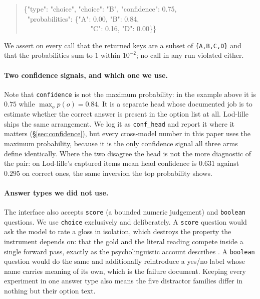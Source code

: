 \documentclass[11pt]{article}
\begin{document}
\begin{quote}\footnotesize\ttfamily
\{"type": "choice", "choice": "B", "confidence": 0.75,\\
\ "probabilities": \{"A": 0.00, "B": 0.84,\\
\ \ \ \ \ \ \ \ \ \ \ \ \ \ \ \ \ \ \ "C": 0.16, "D": 0.00\}\}
\end{quote}

We assert on every call that the returned keys are a subset of
\texttt{\{A,B,C,D\}} and that the probabilities sum to $1$ within $10^{-2}$; no
call in any run violated either.

\paragraph{Two confidence signals, and which one we use.} Note that
\texttt{confidence} is not the maximum probability: in the example above it is
$0.75$ while $\max_o p(o) = 0.84$. It is a separate head whose documented job is
to estimate whether the correct answer is present in the option list at all.
Lod-lille ships the same arrangement. We log it as \texttt{conf\_head} and
report it where it matters (\S\ref{sec:confidence}), but every cross-model
number in this paper uses the maximum probability, because it is the only
confidence signal all three arms define identically. Where the two disagree the
head is not the more diagnostic of the pair: on Lod-lille's captured items mean
head confidence is $0.631$ against $0.295$ on correct ones, the same inversion
the top probability shows.

\paragraph{Answer types we did not use.} The interface also accepts
\texttt{score} (a bounded numeric judgement) and \texttt{boolean} questions. We
use \texttt{choice} exclusively and deliberately. A \texttt{score} question
would ask the model to rate a gloss in isolation, which destroys the property
the instrument depends on: that the gold and the literal reading compete inside
a single forward pass, exactly as the psycholinguistic account describes
\citep{cacciari1988comprehension,titone1999compositional}. A \texttt{boolean}
question would do the same and additionally reintroduce a yes/no label whose
name carries meaning of its own, which is the failure
\citet{sun2026typesafe} document. Keeping every experiment in one answer type
also means the five distractor families differ in nothing but their option text.
\end{document}
